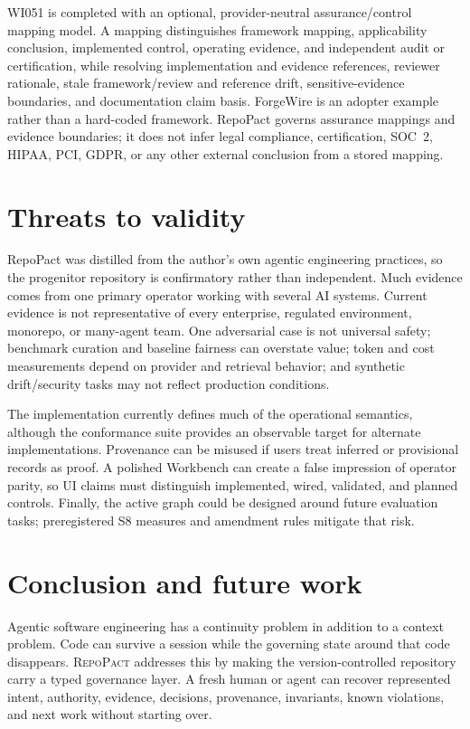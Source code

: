 \documentclass[11pt]{article}
\newcommand{\repo}{\textsc{RepoPact}\xspace}
\begin{document}
WI051 is completed with an optional, provider-neutral assurance/control mapping model. A
mapping distinguishes framework mapping, applicability conclusion, implemented control,
operating evidence, and independent audit or certification, while resolving implementation
and evidence references, reviewer rationale, stale framework/review and reference drift,
sensitive-evidence boundaries, and documentation claim basis. ForgeWire is an adopter
example rather than a hard-coded framework. RepoPact governs assurance mappings and evidence
boundaries; it does not infer legal compliance, certification, SOC~2, HIPAA, PCI, GDPR, or
any other external conclusion from a stored mapping.

\section{Threats to validity}

RepoPact was distilled from the author's own agentic engineering practices, so the
progenitor repository is confirmatory rather than independent. Much evidence comes from
one primary operator working with several AI systems. Current evidence is not
representative of every enterprise, regulated environment, monorepo, or many-agent team.
One adversarial case is not universal safety; benchmark curation and baseline fairness can
overstate value; token and cost measurements depend on provider and retrieval behavior; and
synthetic drift/security tasks may not reflect production conditions.

The implementation currently defines much of the operational semantics, although the
conformance suite provides an observable target for alternate implementations. Provenance
can be misused if users treat inferred or provisional records as proof. A polished
Workbench can create a false impression of operator parity, so UI claims must distinguish
implemented, wired, validated, and planned controls. Finally, the active graph could be
designed around future evaluation tasks; preregistered S8 measures and amendment rules
mitigate that risk.

\section{Conclusion and future work}

Agentic software engineering has a continuity problem in addition to a context problem.
Code can survive a session while the governing state around that code disappears. \repo
addresses this by making the version-controlled repository carry a typed governance layer.
A fresh human or agent can recover represented intent, authority, evidence, decisions,
provenance, invariants, known violations, and next work without starting over.
\end{document}
